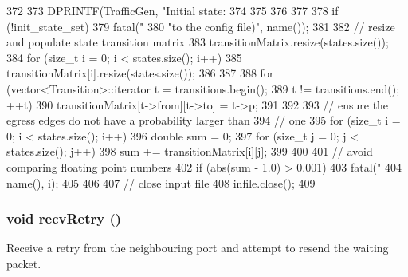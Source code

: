 \begin{DoxyCode}
{{{{372 
373                 DPRINTF(TrafficGen, "Initial state: %
374             }
375         }
376     }
377 
378     if (!init_state_set)
379         fatal("%
380               "to the config file)\n", name());
381 
382     // resize and populate state transition matrix
383     transitionMatrix.resize(states.size());
384     for (size_t i = 0; i < states.size(); i++) {
385         transitionMatrix[i].resize(states.size());
386     }
387 
388     for (vector<Transition>::iterator t = transitions.begin();
389          t != transitions.end(); ++t) {
390         transitionMatrix[t->from][t->to] = t->p;
391     }
392 
393     // ensure the egress edges do not have a probability larger than
394     // one
395     for (size_t i = 0; i < states.size(); i++) {
396         double sum = 0;
397         for (size_t j = 0; j < states.size(); j++) {
398             sum += transitionMatrix[i][j];
399         }
400 
401         // avoid comparing floating point numbers
402         if (abs(sum - 1.0) > 0.001)
403             fatal("%
404                   name(), i);
405     }
406 
407     // close input file
408     infile.close();
409 }
\end{DoxyCode}
\hypertarget{classTrafficGen_a29cb5a4f98063ce6e9210eacbdb35298}{
\subsubsection[{recvRetry}]{\setlength{\rightskip}{0pt plus 5cm}void recvRetry ()}}
\label{classTrafficGen_a29cb5a4f98063ce6e9210eacbdb35298}
Receive a retry from the neighbouring port and attempt to resend the waiting packet. 


